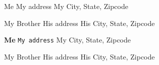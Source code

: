 \documentclass{article}
\begin{document}
\begin{labels}
Me
My address
My City, State, Zipcode

My Brother
His address
His City, State, Zipcode

%
{\bf Me}
\mbox{\tt My address}
My City, State, Zipcode

My Brother
His address
His City, State, Zipcode
\end{labels}
\end{document}
